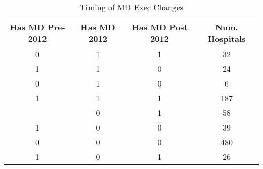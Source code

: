 \begin{table}[ht!]
\centering
\caption{\label{tab:change_timing}Timing of MD Exec Changes}
\centering
\begin{tabular}[t]{cccc}
\toprule
Has MD Pre-2012 & Has MD 2012 & Has MD Post 2012 & Num. Hospitals\\
\midrule
0 & 1 & 1 & 32\\
1 & 1 & 0 & 24\\
0 & 1 & 0 & 6\\
1 & 1 & 1 & 187\\
\addlinespace
0 & 0 & 1 & 58\\
1 & 0 & 0 & 39\\
0 & 0 & 0 & 480\\
1 & 0 & 1 & 26\\
\bottomrule
\end{tabular}
\end{table}
